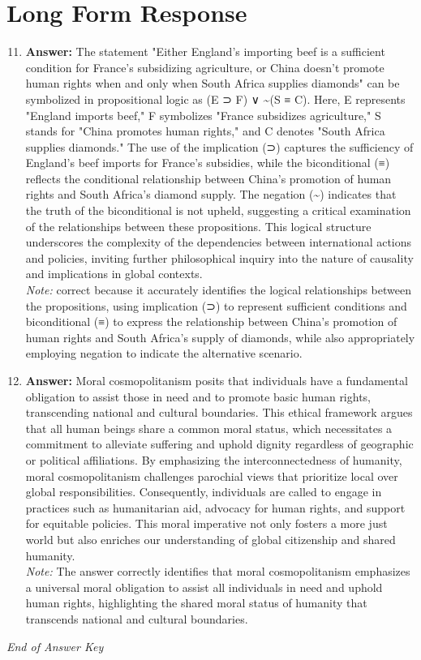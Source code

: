 \documentclass[12pt]{article}
\begin{document}
\section*{Long Form Response}
\begin{enumerate}[label=\arabic*.]
\setcounter{enumi}{10}
\item \textbf{Answer:} The statement "Either England's importing beef is a sufficient condition for France's subsidizing agriculture, or China doesn't promote human rights when and only when South Africa supplies diamonds" can be symbolized in propositional logic as (E ⊃ F) ∨ \textasciitilde{}(S ≡ C). Here, E represents "England imports beef," F symbolizes "France subsidizes agriculture," S stands for "China promotes human rights," and C denotes "South Africa supplies diamonds." The use of the implication (⊃) captures the sufficiency of England's beef imports for France's subsidies, while the biconditional (≡) reflects the conditional relationship between China's promotion of human rights and South Africa's diamond supply. The negation (\textasciitilde{}) indicates that the truth of the biconditional is not upheld, suggesting a critical examination of the relationships between these propositions. This logical structure underscores the complexity of the dependencies between international actions and policies, inviting further philosophical inquiry into the nature of causality and implications in global contexts.
\\ \textit{Note:} correct because it accurately identifies the logical relationships between the propositions, using implication (⊃) to represent sufficient conditions and biconditional (≡) to express the relationship between China's promotion of human rights and South Africa's supply of diamonds, while also appropriately employing negation to indicate the alternative scenario.
\item \textbf{Answer:} Moral cosmopolitanism posits that individuals have a fundamental obligation to assist those in need and to promote basic human rights, transcending national and cultural boundaries. This ethical framework argues that all human beings share a common moral status, which necessitates a commitment to alleviate suffering and uphold dignity regardless of geographic or political affiliations. By emphasizing the interconnectedness of humanity, moral cosmopolitanism challenges parochial views that prioritize local over global responsibilities. Consequently, individuals are called to engage in practices such as humanitarian aid, advocacy for human rights, and support for equitable policies. This moral imperative not only fosters a more just world but also enriches our understanding of global citizenship and shared humanity.
\\ \textit{Note:} The answer correctly identifies that moral cosmopolitanism emphasizes a universal moral obligation to assist all individuals in need and uphold human rights, highlighting the shared moral status of humanity that transcends national and cultural boundaries.
\end{enumerate}

\vfill
\noindent\textit{End of Answer Key}
\end{document}
